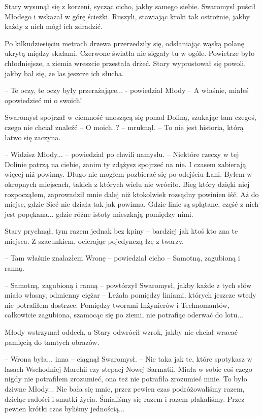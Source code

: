 \par\indent Stary wysunął się z korzeni, sycząc cicho, jakby samego siebie. Swaromysł puścił Młodego i wskazał w górę ścieżki. Ruszyli, stawiając kroki tak ostrożnie, jakby każdy z nich mógł ich zdradzić.
\par\indent Po kilkudziesięciu metrach drzewa przerzedziły się, odsłaniając wąską polanę ukrytą między skałami. Czerwone światła nie sięgały tu w ogóle. Powietrze było chłodniejsze, a ziemia wreszcie przestała drżeć. Stary wyprostował się powoli, jakby bał się, że las jeszcze ich słucha.
\par\noindent-- Te oczy, te oczy były przerażające... - powiedział Młody -- A właśnie, miałeś opowiedzieć mi o swoich!
\par\indent Swaromysł spojrzał w ciemność unoszącą się ponad Doliną, szukając tam czegoś, czego nie chciał znaleźć -- O moich..? -- mruknął. -- To nie jest historia, którą łatwo się zaczyna.
\par\indent-- Widzisz Młody... -- powiedział po chwili namysłu. -- Niektóre rzeczy w tej Dolinie patrzą na ciebie, zanim ty zdążysz spojrzeć na nie. I czasem zabierają więcej niż powinny. Długo nie mogłem pozbierać się po odejściu Łani. Byłem w okropnych miejscach, takich z których wielu nie wróciło. Bieg który dzięki niej rozpocząłem, zaprowadził mnie dalej niż ktokolwiek rozsądny powinien iść. Aż do miejsc, gdzie Sieć nie działa tak jak powinna. Gdzie linie są splątane, część z nich jest popękana... gdzie różne istoty mieszkają pomiędzy nimi.
\par\indent Stary prychnął, tym razem jednak bez kpiny -- bardziej jak ktoś kto zna te miejsca. Z szacunkiem, ocierając pojedynczą łzę z twarzy.
\par\noindent-- Tam właśnie znalazłem Wronę -- powiedział cicho -- Samotną, zagubioną i ranną.
\par\noindent-- Samotną, zagubioną i ranną -- powtórzył Swaromysł, jakby każde z tych słów miało własny, odmienny ciężar -- Leżała pomiędzy liniami, których jeszcze wtedy nie potrafiłem dostrzec. Pomiędzy tworami Inżynierów i Technomantów, całkowicie zagubiona, szamocąc się po ziemi, nie potrafiąc oderwać do lotu...
\par\indent Młody wstrzymał oddech, a Stary odwrócił wzrok, jakby nie chciał wracać pamięcią do tamtych obrazów.
\par\noindent-- Wrona była... inna -- ciągnął Swaromysł. -- Nie taka jak te, które spotykasz w lasach Wschodniej Marchii czy stepacj Nowej Sarmatii. Miała w sobie coś czego nigdy nie potrafiłem zrozumieć, ona też nie potrafiła zrozumieć mnie. To było dziwne Młody... Nie bała się mnie, przez pewien czas podróżowaliśmy razem, dzieląc radości i smutki życia. Śmialiśmy się razem i razem płakaliśmy. Przez pewien krótki czas byliśmy jednością...
